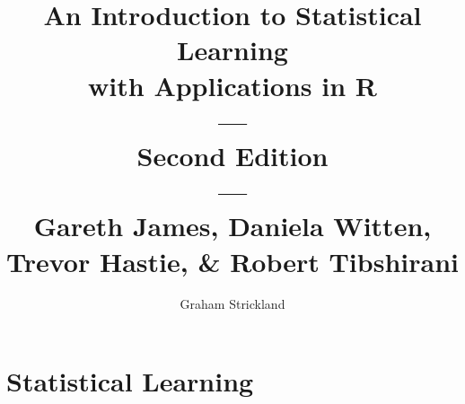 \documentclass{article}
\title{
    An Introduction to Statistical Learning\\with Applications in R\\---\\
    Second Edition\\---\\Gareth James, Daniela Witten, Trevor Hastie, \& Robert Tibshirani
}
\author{Graham Strickland}
\begin{document}
\maketitle  

\setcounter{section}{1}
\section{Statistical Learning}

\end{document}
